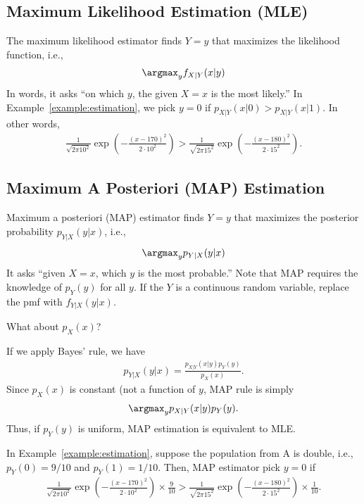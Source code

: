 \documentclass{article}
\begin{document}
\subsection{Maximum Likelihood Estimation (MLE)}
The maximum likelihood estimator finds $Y=y$ that maximizes the likelihood function, i.e.,
\begin{align}
    \argmax_y f_{X|Y}(x|y)
\end{align}
In words, it asks ``on which $y$, the given $X=x$ is the most likely.''
In Example~\ref{example:estimation}, we pick $y=0$ if $p_{X|Y}(x|0) > p_{X|Y}(x|1)$.
In other words,
\begin{align}
    \frac{1}{\sqrt{2\pi 10^2}}\exp\left(-\frac{(x-170)^2}{2\cdot 10^2}\right)
    >\frac{1}{\sqrt{2\pi 15^2}}\exp\left(-\frac{(x-180)^2}{2\cdot 15^2}\right).
\end{align}


\subsection{Maximum A Posteriori (MAP) Estimation}
Maximum a posteriori (MAP) estimator finds $Y=y$ that maximizes the posterior probability $p_{Y|X}(y|x)$, i.e.,
\begin{align}
    \argmax_y p_{Y|X}(y|x)
\end{align}
It asks ``given $X=x$, which $y$ is the most probable.''
Note that MAP requires the knowledge of $p_Y(y)$ for all $y$.
If the $Y$ is a continuous random variable, replace the pmf with $f_{Y|X}(y|x)$.

\begin{question}
    What about $p_X(x)$?
\end{question}

If we apply Bayes' rule, we have
\begin{align}
    p_{Y|X}(y|x) = \frac{p_{X|Y}(x|y)p_Y(y) }{p_X(x)}.
\end{align}
Since $p_X(x)$ is constant (not a function of $y$, MAP rule is simply
\begin{align}
    \argmax_y p_{X|Y}(x|y)p_Y(y).
\end{align}
Thus, if $p_Y(y)$ is uniform, MAP estimation is equivalent to MLE.

In Example~\ref{example:estimation}, suppose the population from A is double, i.e., $p_Y(0) = 9/10$ and $p_Y(1)=1/10$.
Then, MAP estimator pick $y=0$ if
\begin{align}
    \frac{1}{\sqrt{2\pi 10^2}}\exp\left(-\frac{(x-170)^2}{2\cdot 10^2}\right) \times \frac{9}{10}
    >\frac{1}{\sqrt{2\pi 15^2}}\exp\left(-\frac{(x-180)^2}{2\cdot 15^2}\right) \times \frac{1}{10}.
\end{align}
\end{document}
